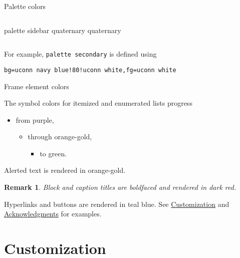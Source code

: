 \documentclass{beamer}
\newtheorem{remark}{Remark}
\begin{document}
\begin{frame}[fragile]{Palette colors}
\begin{columns}
\begin{column}{.5\textwidth}
\begin{beamercolorbox}[sep=4pt,center]{palette sidebar quaternary}
quaternary
\end{beamercolorbox}

\end{column}
\end{columns}

\vspace{2ex}
For example, \verb|palette secondary| is defined using
\begin{verbatim}
bg=uconn navy blue!80!uconn white,fg=uconn white
\end{verbatim}

\end{frame}


\begin{frame}{Frame element colors}

The symbol colors for itemized and enumerated lists progress
\begin{itemize}
\item from purple,
\begin{itemize}
\item through orange-gold,
\begin{itemize}
\item to green.
\end{itemize}
\end{itemize}
\end{itemize}
\alert{Alerted text is rendered in orange-gold.}

\vfill\begin{remark}
Block and caption titles are boldfaced and rendered in dark red.
\end{remark}

\vfill
Hyperlinks and buttons are rendered in teal blue.
See \hyperlink{sec:customization}{Customization} and \hyperlink{slide:acknowledgments}{Acknowledgments} for examples.

\end{frame}


\section{Customization}
\label{sec:customization}
\end{document}
